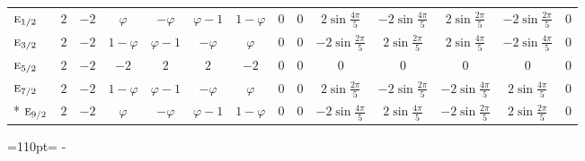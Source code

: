 \documentclass[10pt,a4paper]{article}
\makeatletter
\def\grouprule#1#2{\noalign{\marks\LTgroupmarks{\the\belowrulesep}\nobreak\vskip#1%
  \vskip\aboverulesep}\multispan\LT@cols\unskip{\leaders\hrule\@height#2\hfill\kern\z@}\cr
  \noalign{\penalty\LTrulebreak\vskip\belowrulesep\global\@lastruleclass\z@}}
\newcommand{\needspace}[1]{\par\penalty-100\begingroup\dimen0=#1\relax\dimen2=\pagegoal
  \advance\dimen2-\pagetotal\ifdim\dimen0>\dimen2\relax\ifdim\dimen2>0pt\vfil\break\fi\fi
  \endgroup}
\numberwithin{equation}{section}
\newcommand{\irr}[1]{\text{\normalfont\scshape #1}}
\newcommand{\goldenratio}{\varphi}
\makeatother
\begin{document}
{{\begin{longtable}{@{}lccccccccccccc@{}}
\grouprule{0pt}{\lightrulewidth}
$\irr{e}_{1/2}$ & $2$ & $-2$ & $\goldenratio{}$ & $-\goldenratio{}$ & $\goldenratio - 1$ & $1 - \goldenratio{}$ & $0$ & $0$ & $2\sin\tfrac{4\pi}{5}$ & $-2\sin\tfrac{4\pi}{5}$ & $2\sin\tfrac{2\pi}{5}$ & $-2\sin\tfrac{2\pi}{5}$ & $0$\\
$\irr{e}_{3/2}$ & $2$ & $-2$ & $1 - \goldenratio{}$ & $\goldenratio - 1$ & $-\goldenratio{}$ & $\goldenratio{}$ & $0$ & $0$ & $-2\sin\tfrac{2\pi}{5}$ & $2\sin\tfrac{2\pi}{5}$ & $2\sin\tfrac{4\pi}{5}$ & $-2\sin\tfrac{4\pi}{5}$ & $0$\\
$\irr{e}_{5/2}$ & $2$ & $-2$ & $-2$ & $2$ & $2$ & $-2$ & $0$ & $0$ & $0$ & $0$ & $0$ & $0$ & $0$\\
$\irr{e}_{7/2}$ & $2$ & $-2$ & $1 - \goldenratio{}$ & $\goldenratio - 1$ & $-\goldenratio{}$ & $\goldenratio{}$ & $0$ & $0$ & $2\sin\tfrac{2\pi}{5}$ & $-2\sin\tfrac{2\pi}{5}$ & $-2\sin\tfrac{4\pi}{5}$ & $2\sin\tfrac{4\pi}{5}$ & $0$\\*
$\irr{e}_{9/2}$ & $2$ & $-2$ & $\goldenratio{}$ & $-\goldenratio{}$ & $\goldenratio - 1$ & $1 - \goldenratio{}$ & $0$ & $0$ & $-2\sin\tfrac{4\pi}{5}$ & $2\sin\tfrac{4\pi}{5}$ & $-2\sin\tfrac{2\pi}{5}$ & $2\sin\tfrac{2\pi}{5}$ & $0$\\
\bottomrule\end{longtable}}}
\needspace{110pt}
\end{document}
